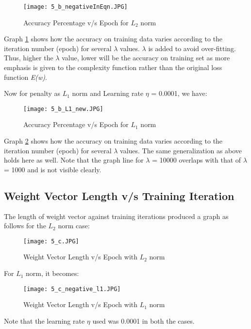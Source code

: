 \documentclass{article}
\begin{document}
\begin{figure}
  \texttt{[image: 5\_b\_negativeInEqn.JPG]}
  \caption{Accuracy Percentage v/s Epoch for $L_{2}$ norm}
  \label{fig:graph 5(b) l2}
\end{figure}

Graph \ref{fig:graph 5(b) l2} shows how the accuracy on training data varies according to the iteration number (epoch) for several $\lambda$ values. $\lambda$ is added to avoid over-fitting. Thus, higher the $\lambda$ value, lower will be the accuracy on training set as more emphasis is given to the complexity function rather than the original loss function \emph{E(w)}.

Now for penalty as $L_{1}$ norm and Learning rate $\eta$ = 0.0001, we have:

\begin{figure}
  \texttt{[image: 5\_b\_L1\_new.JPG]}
  \caption{Accuracy Percentage v/s Epoch for $L_{1}$ norm}
  \label{fig:graph 5(b) l1}
\end{figure}

Graph \ref{fig:graph 5(b) l1} shows how the accuracy on training data varies according to the iteration number (epoch) for several $\lambda$ values. The same generalization as above holds here as well. Note that the graph line for $\lambda$ = 10000 overlaps with that of $\lambda$ = 1000 and is not visible clearly.

\subsection{Weight Vector Length v/s Training Iteration}

The length of weight vector against training iterations produced a graph as follows for the $L_{2}$ norm case:

\begin{figure}
  \texttt{[image: 5\_c.JPG]}
  \caption{Weight Vector Length v/s Epoch with $L_{2}$ norm}
  \label{fig:graph 5(c) l2}
\end{figure}

For $L_{1}$ norm, it becomes:

\begin{figure}
  \texttt{[image: 5\_c\_negative\_l1.JPG]}
  \caption{Weight Vector Length v/s Epoch with $L_{1}$ norm}
  \label{fig:graph 5(c) l1}
\end{figure}

Note that the learning rate $\eta$ used was 0.0001 in both the cases.
\end{document}
